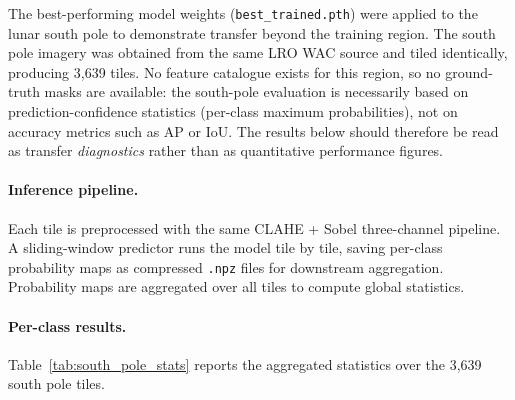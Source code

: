\documentclass{aa}
\begin{document}
The best-performing model weights (\texttt{best\_trained.pth}) were applied to the lunar south pole to demonstrate transfer beyond the training region. The south pole imagery was obtained from the same LRO WAC source and tiled identically, producing 3{,}639 tiles. No feature catalogue exists for this region, so no ground-truth masks are available: the south-pole evaluation is necessarily based on prediction-confidence statistics (per-class maximum probabilities), not on accuracy metrics such as AP or IoU. The results below should therefore be read as transfer \emph{diagnostics} rather than as quantitative performance figures.

\paragraph{Inference pipeline.}
Each tile is preprocessed with the same CLAHE + Sobel three-channel pipeline. A sliding-window predictor runs the model tile by tile, saving per-class probability maps as compressed \texttt{.npz} files for downstream aggregation. Probability maps are aggregated over all tiles to compute global statistics.

\paragraph{Per-class results.}
Table~\ref{tab:south_pole_stats} reports the aggregated statistics over the 3{,}639 south pole tiles.

\begin{table}[htbp]
\centering
\caption{South pole inference results (3{,}639 tiles). Avg.\ Max.\ Prob.\ is the mean, over tiles, of the maximum predicted probability for each class. Global Max is the highest probability observed in any single tile.}
\label{tab:south_pole_stats}
\end{table}
\end{document}
